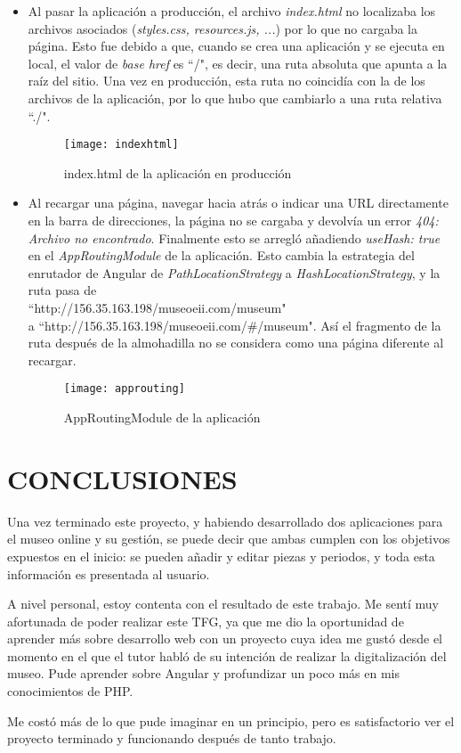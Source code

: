 \begin{itemize}
\item Al pasar la aplicación a producción, el archivo \textit{index.html} no localizaba los archivos asociados (\textit{styles.css, resources.js, ...}) por lo que no cargaba la página. Esto fue debido a que, cuando se crea una aplicación y se ejecuta en local, el valor de \textit{base href} es ``/", es decir, una ruta absoluta que apunta a la raíz del sitio. Una vez en producción, esta ruta no coincidía con la de los archivos de la aplicación, por lo que hubo que cambiarlo a una ruta relativa ``./".
\begin{figure}[H]
\centering
\centerline{\texttt{[image: indexhtml]}}
\caption{index.html de la aplicación en producción}
\end{figure}
\item Al recargar una página, navegar hacia atrás o indicar una URL directamente en la barra de direcciones, la página no se cargaba y devolvía un error \textit{404: Archivo no encontrado}. Finalmente esto se arregló añadiendo \textit{useHash: true} en el \textit{AppRoutingModule} de la aplicación. Esto cambia la estrategia del enrutador de Angular de \textit{PathLocationStrategy} a \textit{HashLocationStrategy}, y la ruta pasa de \\``http://156.35.163.198/museoeii.com/museum"  \\a ``http://156.35.163.198/museoeii.com/\#/museum". Así el fragmento de la ruta después de la almohadilla no se considera como una página diferente al recargar.
\begin{figure}[H]
\centering
\texttt{[image: approuting]}
\caption{AppRoutingModule de la aplicación}
\end{figure}
\end{itemize}

\newpage
\section{CONCLUSIONES}
Una vez terminado este proyecto, y habiendo desarrollado dos aplicaciones para el museo online y su gestión, se puede decir que ambas cumplen con los objetivos expuestos en el inicio: se pueden añadir y editar piezas y periodos, y toda esta información es presentada al usuario.\par
A nivel personal, estoy contenta con el resultado de este trabajo. Me sentí muy afortunada de poder realizar este TFG, ya que me dio la oportunidad de aprender más sobre desarrollo web con un proyecto cuya idea me gustó desde el momento en el que el tutor habló de su intención de realizar la digitalización del museo. Pude aprender sobre Angular y profundizar un poco más en mis conocimientos de PHP. \par
Me costó más de lo que pude imaginar en un principio, pero es satisfactorio ver el proyecto terminado y funcionando después de tanto trabajo.


